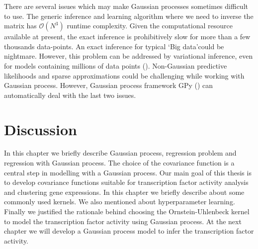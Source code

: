 There are several issues which may make Gaussian processes sometimes difficult to use. The generic inference and learning algorithm where we need to inverse the matrix has $\mathcal{O}\left(N^3\right)$ runtime complexity. Given the computational resource available at present, the exact inference is prohibitively slow for more than a few thousands data-points. An exact inference for typical \lq Big data\rq  could be nightmare. However, this problem can be addressed by variational inference, even for models containing millions of data points (\cite{Hensman:2013a}). Non-Gaussian predictive likelihoods and sparse approximations could be challenging while working with Gaussian process. However, Gaussian process framework GPy (\cite{gpy2014}) can automatically deal with the last two issues. 

\section{Discussion}
In this chapter we briefly describe Gaussian process, regression problem and regression with Gaussian process. The choice of the covariance function is a central step in modelling with a Gaussian process. Our main goal of this thesis is to develop covariance functions suitable for transcription factor activity analysis and clustering gene expressions. In this chapter we briefly describe about some commonly used kernels. We also mentioned about hyperparameter learning. Finally we justified the rationale behind choosing the Ornstein-Uhlenbeck kernel to model the transcription factor activity using Gaussian process. At the next chapter we will develop a Gaussian process model to infer the transcription factor activity.
